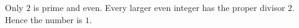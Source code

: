 Only $2$ is prime and even. Every larger even integer has the proper divisor $2$. Hence the number is $\boxed1$.
